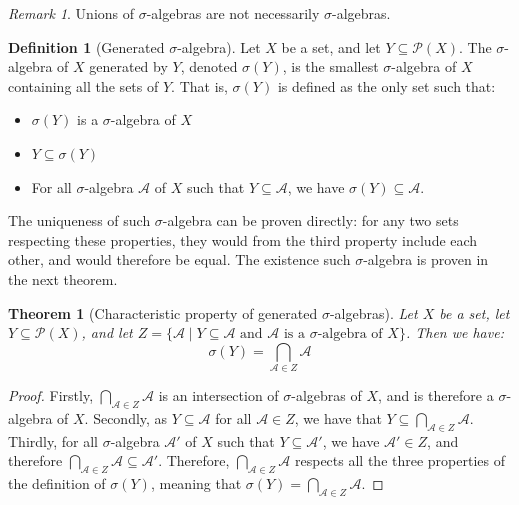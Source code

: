 \documentclass{article}
\newtheorem{theorem}{Theorem}[section]
\theoremstyle{definition}
\newtheorem{definition}{Definition}[section]
\theoremstyle{remark}
\newtheorem*{remark}{Remark}
\theoremstyle{example}
\theoremstyle{notation}
\theoremstyle{axiom}
\begin{document}
\begin{remark}
    Unions of $\sigma$-algebras are not necessarily $\sigma$-algebras.
\end{remark}

\begin{definition}[Generated $\sigma$-algebra]
    Let $X$ be a set, and let $Y \subseteq \mathcal{P}(X)$. The $\sigma$-algebra of $X$ generated by $Y$, denoted $\sigma(Y)$, is the smallest $\sigma$-algebra of $X$ containing all the sets of $Y$. That is, $\sigma(Y)$ is defined as the only set such that:
    \begin{itemize}
        \item $\sigma(Y)$ is a $\sigma$-algebra of $X$
        \item $Y \subseteq \sigma(Y)$
        \item For all $\sigma$-algebra $\mathcal{A}$ of $X$ such that $Y \subseteq \mathcal{A}$, we have $\sigma(Y) \subseteq \mathcal{A}$.
    \end{itemize}
    The uniqueness of such $\sigma$-algebra can be proven directly: for any two sets respecting these properties, they would from the third property include each other, and would therefore be equal. The existence such $\sigma$-algebra is proven in the next theorem.
\end{definition}

\begin{theorem}[Characteristic property of generated $\sigma$-algebras]
    Let $X$ be a set, let $Y \subseteq \mathcal{P}(X)$, and let $Z = \{\mathcal{A} \mid \text{$Y \subseteq \mathcal{A}$ and $\mathcal{A}$ is a $\sigma$-algebra of $X$}\}$. Then we have:
        $$\sigma(Y) = \bigcap_{\mathcal{A} \in Z} \mathcal{A}$$
\end{theorem}

\begin{proof}
		Firstly, $\bigcap_{\mathcal{A} \in Z} \mathcal{A}$ is an intersection of $\sigma$-algebras of $X$, and is therefore a $\sigma$-algebra of $X$. Secondly, as $Y \subseteq \mathcal{A}$ for all $\mathcal{A} \in Z$, we have that $Y \subseteq \bigcap_{\mathcal{A} \in Z} \mathcal{A}$. Thirdly, for all $\sigma$-algebra $\mathcal{A}'$ of $X$ such that $Y \subseteq \mathcal{A}'$, we have $\mathcal{A}' \in Z$, and therefore $\bigcap_{\mathcal{A} \in Z} \mathcal{A} \subseteq \mathcal{A}'$. Therefore, $\bigcap_{\mathcal{A} \in Z} \mathcal{A}$ respects all the three properties of the definition of $\sigma(Y)$, meaning that $\sigma(Y) = \bigcap_{\mathcal{A} \in Z} \mathcal{A}$.
\end{proof}
\end{document}
